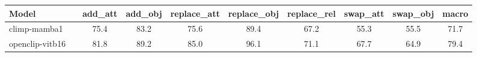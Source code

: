 \begin{tabular}{llcccccccc}
\toprule
Model &  & add\_att & add\_obj & replace\_att & replace\_obj & replace\_rel & swap\_att & swap\_obj & macro \\
\midrule
climp-mamba1 &  & 75.4 & 83.2 & 75.6 & 89.4 & 67.2 & 55.3 & 55.5 & 71.7 \\
openclip-vitb16 &  & 81.8 & 89.2 & 85.0 & 96.1 & 71.1 & 67.7 & 64.9 & 79.4 \\
\bottomrule
\end{tabular}
